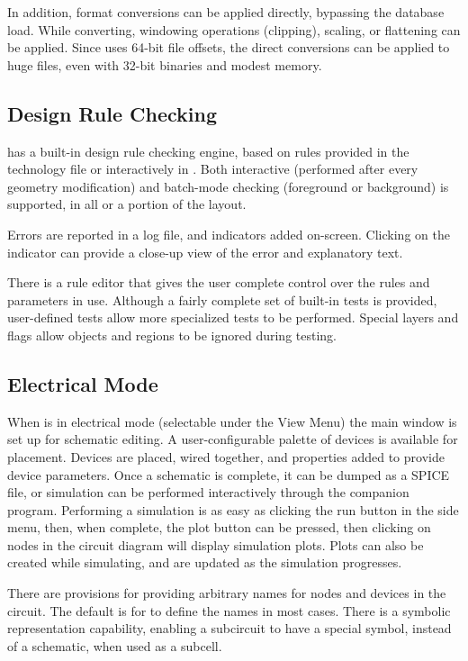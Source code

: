 In addition, format conversions can be applied directly, bypassing the
database load.  While converting, windowing operations (clipping),
scaling, or flattening can be applied.  Since {\Xic} uses 64-bit file
offsets, the direct conversions can be applied to huge files, even
with 32-bit {\Xic} binaries and modest memory.

\subsection{Design Rule Checking}

{\Xic} has a built-in design rule checking engine, based on rules
provided in the technology file or interactively in {\Xic}.  Both
interactive (performed after every geometry modification) and
batch-mode checking (foreground or background) is supported, in all or
a portion of the layout.

Errors are reported in a log file, and indicators added on-screen. 
Clicking on the indicator can provide a close-up view of the error and
explanatory text.

There is a rule editor that gives the user complete control over the
rules and parameters in use.  Although a fairly complete set of
built-in tests is provided, user-defined tests allow more specialized
tests to be performed.  Special layers and flags allow objects and
regions to be ignored during testing.

\subsection{Electrical Mode}

When {\Xic} is in electrical mode (selectable under the {\cb View
Menu}) the main window is set up for schematic editing.  A
user-configurable palette of devices is available for placement. 
Devices are placed, wired together, and properties added to provide
device parameters.  Once a schematic is complete, it can be dumped as
a SPICE file, or simulation can be performed interactively through the
companion {\WRspice} program.  Performing a simulation is as easy as
clicking the {\cb run} button in the side menu, then, when complete,
the {\cb plot} button can be pressed, then clicking on nodes in the
circuit diagram will display simulation plots.  Plots can also be
created while simulating, and are updated as the simulation
progresses.

There are provisions for providing arbitrary names for nodes and
devices in the circuit.  The default is for {\Xic} to define the names
in most cases.  There is a symbolic representation capability,
enabling a subcircuit to have a special symbol, instead of a
schematic, when used as a subcell.

